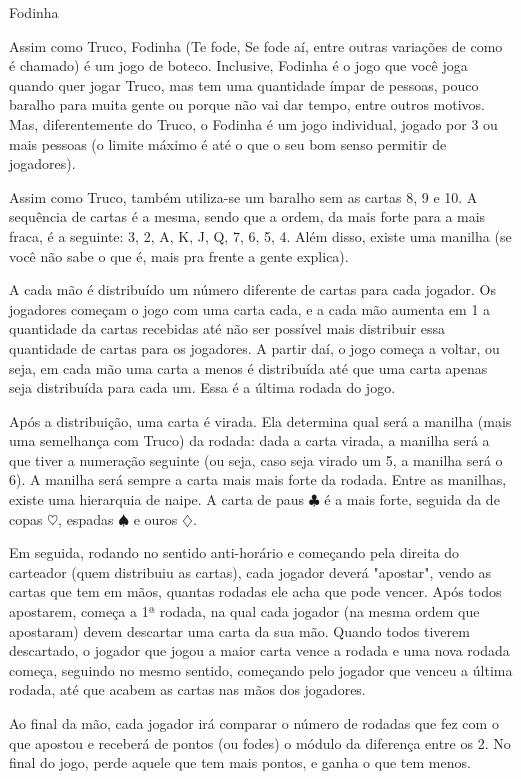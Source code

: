\begin{subsecao}{Fodinha}

Assim como Truco, Fodinha (Te fode, Se fode aí, entre outras variações de
como é chamado) é um jogo de boteco. Inclusive, Fodinha é o jogo
que você joga quando quer jogar Truco, mas tem uma quantidade ímpar de 
pessoas, pouco baralho para muita gente ou porque não vai dar tempo, entre
outros motivos. Mas, diferentemente do Truco, o Fodinha é um jogo individual,
jogado por 3 ou mais pessoas (o limite máximo é até o que o seu bom senso
permitir de jogadores).

Assim como Truco, também utiliza-se um baralho sem as cartas 8, 9 e 10. A sequência
de cartas é a mesma, sendo que a ordem, da mais forte para a mais fraca, é a seguinte:
3, 2, A, K, J, Q, 7, 6, 5, 4. Além disso, existe uma manilha (se você não sabe o que é,
mais pra frente a gente explica).

A cada mão é distribuído um número diferente de cartas para cada jogador. Os
jogadores começam o jogo com uma carta cada, e a cada mão aumenta em 1 a
quantidade da cartas recebidas até não ser possível mais distribuir essa quantidade de
cartas para os jogadores. A partir daí, o jogo começa a voltar, ou seja, em cada mão uma
carta a menos é distribuída até que uma carta apenas seja distribuída para 
cada um. Essa é a última rodada do jogo.

Após a distribuição, uma carta é virada. Ela determina qual será a 
manilha (mais uma semelhança com Truco) da rodada: dada a carta virada, a manilha será
a que tiver a numeração seguinte (ou seja, caso seja virado um 5, a manilha
será o 6). A manilha será sempre a carta mais mais forte da rodada. Entre as manilhas,
existe uma hierarquia de naipe. A carta de paus $\clubsuit$ é a mais forte, seguida da de
copas $\heartsuit$, espadas $\spadesuit$ e ouros $\diamondsuit$.

Em seguida, rodando no sentido anti-horário e começando pela direita do carteador (quem
distribuiu as cartas), cada jogador deverá "apostar", vendo as cartas que tem em mãos,
quantas rodadas ele acha que pode vencer. Após todos apostarem, começa a 1ª
rodada, na qual cada jogador (na mesma ordem que apostaram) devem descartar uma carta da sua
mão. Quando todos tiverem descartado, o jogador que jogou a maior carta vence a rodada e uma
nova rodada começa, seguindo no mesmo sentido, começando pelo jogador que venceu a última
rodada, até que acabem as cartas nas mãos dos jogadores.

Ao final da mão, cada jogador irá comparar o número de rodadas que fez com o que
apostou e receberá de pontos (ou fodes) o módulo da diferença entre os 2. No final do jogo,
perde aquele que tem mais pontos, e ganha o que tem menos.


\end{subsecao}
